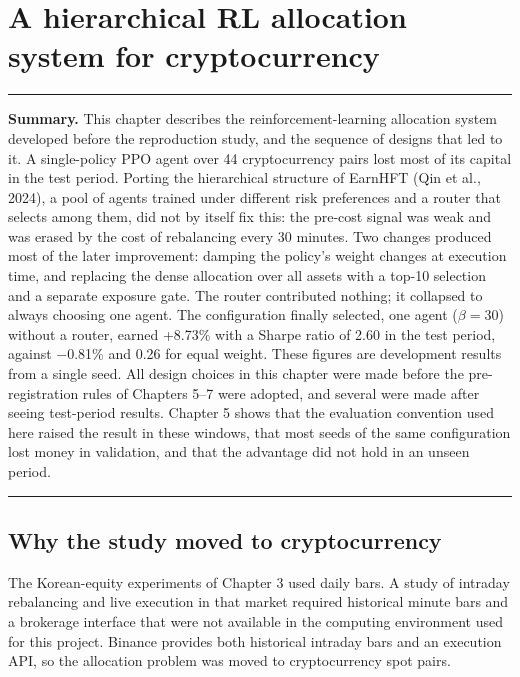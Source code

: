 \documentclass[12pt,a4paper]{report}
\begin{document}
\chapter{A hierarchical RL allocation system for
cryptocurrency}\label{chapter-4.-a-hierarchical-rl-allocation-system-for-cryptocurrency}

\begin{center}\rule{0.5\linewidth}{0.5pt}\end{center}

\textbf{Summary.} This chapter describes the reinforcement-learning
allocation system developed before the reproduction study, and the
sequence of designs that led to it. A single-policy PPO agent over 44
cryptocurrency pairs lost most of its capital in the test period.
Porting the hierarchical structure of EarnHFT (Qin et al., 2024), a pool
of agents trained under different risk preferences and a router that
selects among them, did not by itself fix this: the pre-cost signal was
weak and was erased by the cost of rebalancing every 30 minutes. Two
changes produced most of the later improvement: damping the policy's
weight changes at execution time, and replacing the dense allocation
over all assets with a top-10 selection and a separate exposure gate.
The router contributed nothing; it collapsed to always choosing one
agent. The configuration finally selected, one agent (\(\beta=30\))
without a router, earned +8.73\% with a Sharpe ratio of 2.60 in the test
period, against −0.81\% and 0.26 for equal weight. These figures are
development results from a single seed. All design choices in this
chapter were made before the pre-registration rules of Chapters 5--7
were adopted, and several were made after seeing test-period results.
Chapter 5 shows that the evaluation convention used here raised the
result in these windows, that most seeds of the same configuration lost
money in validation, and that the advantage did not hold in an unseen
period.

\begin{center}\rule{0.5\linewidth}{0.5pt}\end{center}

\section{Why the study moved to
cryptocurrency}\label{why-the-study-moved-to-cryptocurrency}

The Korean-equity experiments of Chapter 3 used daily bars. A study of
intraday rebalancing and live execution in that market required
historical minute bars and a brokerage interface that were not available
in the computing environment used for this project. Binance provides
both historical intraday bars and an execution API, so the allocation
problem was moved to cryptocurrency spot pairs.
\end{document}
